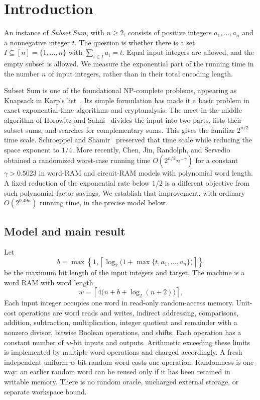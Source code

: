 \section{Introduction}\label{sec:introduction}

An instance of \emph{Subset Sum}, with $n\ge2$, consists of positive integers
$a_1,\ldots,a_n$ and a nonnegative integer $t$.  The question is whether
there is a set $I\subseteq[n]=\{1,\ldots,n\}$ with
$\sum_{i\in I}a_i=t$.  Equal input integers are allowed, and the empty
subset is allowed.  We measure the exponential part of the running time
in the number $n$ of input integers, rather than in their total encoding
length.

Subset Sum is one of the foundational NP-complete problems, appearing
as Knapsack in Karp's list~\cite{Karp1972}.  Its simple formulation has
made it a basic problem in exact exponential-time algorithms and
cryptanalysis.  The meet-in-the-middle algorithm of Horowitz and
Sahni~\cite{HorowitzSahni1974} divides the input into two parts, lists
their subset sums, and searches for complementary sums.  This gives
the familiar $2^{n/2}$ time scale.  Schroeppel and
Shamir~\cite{SchroeppelShamir1981} preserved that time scale while
reducing the space exponent to $1/4$.  More recently, Chen, Jin,
Randolph, and Servedio~\cite{CJRS2023} obtained a randomized worst-case running
time $O(2^{n/2}n^{-\gamma})$ for a constant $\gamma>0.5023$ in word-RAM
and circuit-RAM models with polynomial word length.  A fixed reduction
of the exponential rate below $1/2$ is a different objective from
such polynomial-factor savings.  We
establish that improvement, with ordinary $O(2^{0.49n})$ running time,
in the precise model below.

\subsection{Model and main result}

Let
\[
 b=\max\left\{1,\left\lceil
       \log_2\bigl(1+\max\{t,a_1,\ldots,a_n\}\bigr)
                         \right\rceil\right\}
\]
be the maximum bit length of the input integers and target.
The machine is a word RAM with word length
\begin{equation}\label{eq:word-length}
 w=\left\lceil4\bigl(n+b+\log_2(n+2)\bigr)\right\rceil.
\end{equation}
Each input integer occupies one word in read-only random-access
memory.  Unit-cost operations are word reads and writes, indirect
addressing, comparisons, addition, subtraction, multiplication,
integer quotient and remainder with a nonzero divisor, bitwise Boolean
operations, and shifts.  Each operation has a constant number of
$w$-bit inputs and outputs.  Arithmetic exceeding these limits is
implemented by multiple word operations and charged accordingly.
A fresh independent uniform $w$-bit random word costs one operation.
Randomness is one-way: an earlier random word can be reused only if it
has been retained in writable memory.  There is no random oracle,
uncharged external storage, or separate workspace bound.

